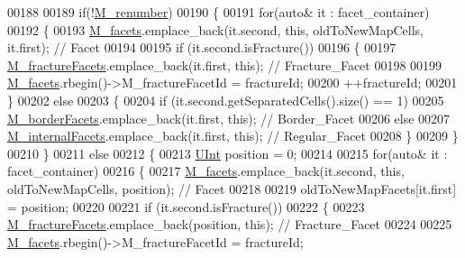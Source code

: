 \begin{DoxyCode}
00188 
00189     \textcolor{keywordflow}{if}(!\hyperlink{classFVCode3D_1_1Rigid__Mesh_a3d9468c34407de926f494d4aa47af64f}{M\_renumber})
00190     \{
00191         \textcolor{keywordflow}{for}(\textcolor{keyword}{auto}& it : facet\_container)
00192         \{
00193             \hyperlink{classFVCode3D_1_1Rigid__Mesh_a62757eb1d9c54b4421880b3c271b4c3b}{M\_facets}.emplace\_back(it.second, \textcolor{keyword}{this}, oldToNewMapCells, it.first); \textcolor{comment}{// Facet}
00194 
00195             \textcolor{keywordflow}{if} (it.second.isFracture())
00196             \{
00197                 \hyperlink{classFVCode3D_1_1Rigid__Mesh_acaff9da1f03f04f7012cf372f8f27cd6}{M\_fractureFacets}.emplace\_back(it.first, \textcolor{keyword}{this}); \textcolor{comment}{// Fracture\_Facet}
00198 
00199                 \hyperlink{classFVCode3D_1_1Rigid__Mesh_a62757eb1d9c54b4421880b3c271b4c3b}{M\_facets}.rbegin()->M\_fractureFacetId = fractureId;
00200                 ++fractureId;
00201             \}
00202             \textcolor{keywordflow}{else}
00203             \{
00204                 \textcolor{keywordflow}{if} (it.second.getSeparatedCells().size() == 1)
00205                     \hyperlink{classFVCode3D_1_1Rigid__Mesh_a21700f8c7b816da944a829ee9d3ab7fb}{M\_borderFacets}.emplace\_back(it.first, \textcolor{keyword}{this}); \textcolor{comment}{// Border\_Facet}
00206                 \textcolor{keywordflow}{else}
00207                     \hyperlink{classFVCode3D_1_1Rigid__Mesh_a8ede7966973fec708327b95fc379a4e1}{M\_internalFacets}.emplace\_back(it.first, \textcolor{keyword}{this}); \textcolor{comment}{// Regular\_Facet}
00208             \}
00209         \}
00210     \}
00211     \textcolor{keywordflow}{else}
00212     \{
00213         \hyperlink{namespaceFVCode3D_a4bf7e328c75d0fd504050d040ebe9eda}{UInt} position = 0;
00214 
00215         \textcolor{keywordflow}{for}(\textcolor{keyword}{auto}& it : facet\_container)
00216         \{
00217             \hyperlink{classFVCode3D_1_1Rigid__Mesh_a62757eb1d9c54b4421880b3c271b4c3b}{M\_facets}.emplace\_back(it.second, \textcolor{keyword}{this}, oldToNewMapCells, position); \textcolor{comment}{// Facet}
00218 
00219             oldToNewMapFacets[it.first] = position;
00220 
00221             \textcolor{keywordflow}{if} (it.second.isFracture())
00222             \{
00223                 \hyperlink{classFVCode3D_1_1Rigid__Mesh_acaff9da1f03f04f7012cf372f8f27cd6}{M\_fractureFacets}.emplace\_back(position, \textcolor{keyword}{this}); \textcolor{comment}{// Fracture\_Facet}
00224 
00225                 \hyperlink{classFVCode3D_1_1Rigid__Mesh_a62757eb1d9c54b4421880b3c271b4c3b}{M\_facets}.rbegin()->M\_fractureFacetId = fractureId;

\end{DoxyCode}
